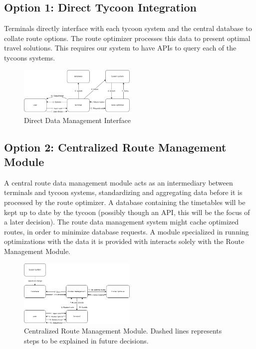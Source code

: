 \subsection*{Option 1: Direct Tycoon Integration}
Terminals directly interface with each tycoon system and the central database to collate route options. The route optimizer processes this data to present optimal travel solutions. This requires our system to have APIs to query each of the tycoons systems.
\begin{figure}[ht]
    \centering
    \includegraphics[width=0.5\textwidth]{drawings/decision3_drawings/direct.png}
    \caption{Direct Data Management Interface}
    \label{fig:direct-data-interface}
\end{figure}

\subsection*{Option 2: Centralized Route Management Module}
A central route data management module acts as an intermediary between terminals and tycoon systems, standardizing and aggregating data before it is processed by the route optimizer. A database containing the timetables will be kept up to date by the tycoon (possibly though an API, this will be the focus of a later decision). The route data management system might cache optimized routes, in order to minimize database requests. A module specialized in running optimizations with the data it is provided with interacts solely with the Route Management Module.
\begin{figure}[ht]
    \centering
    \includegraphics[width=0.5\textwidth]{drawings/decision3_drawings/centralized.png}
    \caption{Centralized Route Management Module. Dashed lines represents steps to be explained in future decisions.}
    \label{fig:centralized-data-interface}
\end{figure}
  

